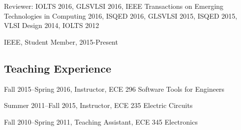 \documentclass[letterpaper]{article}
\renewenvironment{itemize}{
  \begin{list}{}{
    \setlength{\leftmargin}{1.5em}
  }
}{
  \end{list}
}
\begin{document}
\begin{itemize}
	\item Reviewer: IOLTS 2016, GLSVLSI 2016,  IEEE Transactions on Emerging Technologies in Computing 2016, ISQED 2016, GLSVLSI 2015, ISQED 2015, VLSI Design 2014, IOLTS 2012
	\item IEEE, Student Member, 2015-Present
\end{itemize}

\subsection*{Teaching Experience}

\begin{itemize}
	\item Fall 2015--Spring 2016, Instructor, ECE 296 Software Tools for Engineers
	\item Summer 2011--Fall 2015, Instructor, ECE 235 Electric Circuits
	\item Fall 2010--Spring 2011, Teaching Assistant, ECE 345 Electronics
\end{itemize}
\end{document}
